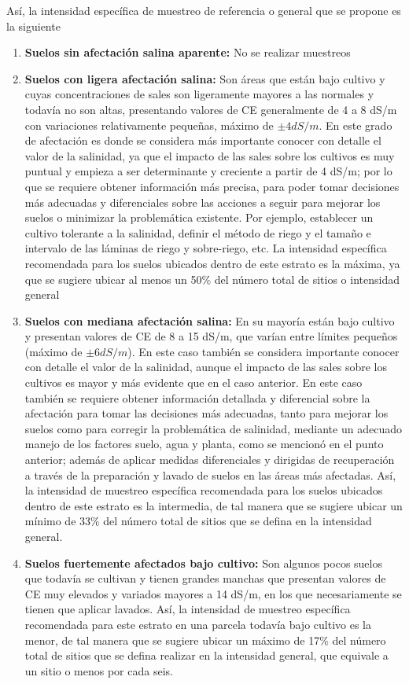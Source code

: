 Así, la intensidad específica de muestreo de referencia o general que se propone es la siguiente

\begin{enumerate}
  \item \textbf{Suelos sin afectación salina aparente:} No se realizar muestreos
  \item \textbf{Suelos con ligera afectación salina:} Son áreas que están bajo cultivo y cuyas concentraciones de sales son ligeramente mayores a las normales y todavía no son altas, presentando valores de CE generalmente de 4 a 8 dS/m con variaciones relativamente pequeñas, máximo de $\pm 4 dS/m$. En este grado de afectación es donde se considera más importante conocer con detalle el valor de la salinidad, ya que el impacto de las sales sobre los cultivos es muy puntual y empieza a ser determinante y creciente a partir de 4 dS/m; por lo que se requiere obtener información más precisa, para poder tomar decisiones más adecuadas y diferenciales sobre las acciones a seguir para mejorar los suelos o minimizar la problemática existente. Por ejemplo, establecer un cultivo tolerante a la salinidad, definir el método de riego y el tamaño e intervalo de las láminas de riego y sobre-riego, etc. La intensidad específica recomendada para los suelos ubicados dentro de este estrato es la máxima, ya que se sugiere ubicar al menos un 50\% del número total de sitios o intensidad general  
  \item \textbf{Suelos con mediana afectación salina:} En su mayoría están bajo cultivo y presentan valores de CE de 8 a 15 dS/m, que varían entre límites pequeños (máximo de $\pm 6 dS/m$). En este caso también se considera importante conocer con detalle el valor de la salinidad, aunque el impacto de las sales sobre los cultivos es mayor y más evidente que en el caso anterior. En este caso también se requiere obtener información detallada y diferencial sobre la afectación para tomar las decisiones más adecuadas, tanto para mejorar los suelos como para corregir la problemática de salinidad, mediante un adecuado manejo de los factores suelo, agua y planta, como se mencionó en el punto anterior; además de aplicar medidas diferenciales y dirigidas de recuperación a través de la preparación y lavado de suelos en las áreas más afectadas. Así, la intensidad de muestreo específica recomendada para los suelos ubicados dentro de este estrato es la intermedia, de tal manera que se sugiere ubicar un mínimo de 33\% del número total de sitios que se defina en la intensidad general.
  \item \textbf{Suelos fuertemente afectados bajo cultivo:} Son algunos pocos suelos que todavía se cultivan y tienen grandes manchas que presentan valores de CE muy elevados y variados mayores a 14 dS/m, en los que necesariamente se tienen que aplicar lavados. Así, la intensidad de muestreo específica recomendada para este estrato en una parcela todavía bajo cultivo es la menor, de tal manera que se sugiere ubicar un máximo de 17\% del número total de sitios que se defina realizar en la intensidad general, que equivale a un sitio o menos por cada seis.

\end{enumerate}
